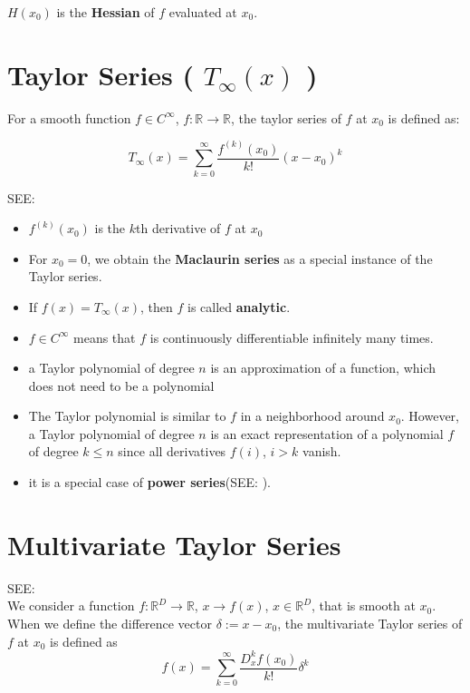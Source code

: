 $H(x_0)$ is the \textbf{Hessian} of $f$ evaluated at $x_0$.


\section{Taylor Series ( $T_\infty(x)$ )}\label{Taylor Series}
For a smooth function $f \in C^\infty$, $f : \mathbb{R} \rightarrow \mathbb{R}$, the taylor series of $f$ at $x_0$ is defined as:

\[
    T_\infty(x) = \sum_{k=0}^{\infty}\displaystyle\frac{f^{(k)}(x_0)}{k!}(x-x_0)^k
\]

SEE: 
\begin{itemize}
    \item $f^{(k)}(x_0)$ is the $k$th derivative of $f$ at $x_0$

    \item For $x_0 = 0$, we obtain the \textbf{Maclaurin series} as a special instance of the Taylor series. 
    
    \item If $f(x) = T_\infty(x)$, then $f$ is called \textbf{analytic}.
    
    \item $f \in C^\infty$ means that $f$ is continuously differentiable infinitely many times.

    \item a Taylor polynomial of degree $n$ is an approximation of a function, which does not need to be a polynomial

    \item The Taylor polynomial is similar to $f$ in a neighborhood around $x_0$. However, a Taylor polynomial of degree $n$ is an exact representation of a polynomial $f$ of degree $k \leq n$ since all derivatives $f(i)$, $i > k$ vanish.

    \item it is a special case of \textbf{power series}(SEE: ).

\end{itemize}


\section{Multivariate Taylor Series}\label{Multivariate Taylor Series}

SEE: \\
We consider a function $f : \mathbb{R}^D \rightarrow \mathbb{R}$, $x \rightarrow f(x)$, $x \in \mathbb{R}^D$, that is smooth at $x_0$. When we define the difference vector $\delta := x - x_0$, the multivariate Taylor series of $f$ at $x_0$ is defined as
\[
    f(x) = \sum_{k=0}^{\infty} \displaystyle\frac{D_x^k f(x_0)}{k!}\delta^k
\]

